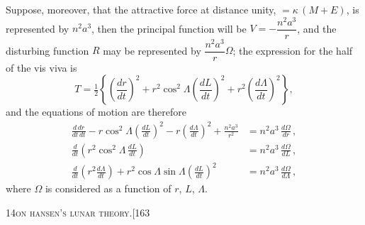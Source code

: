 \documentclass[11pt]{article}
\begin{document}
Suppose, moreover, that the attractive force at distance unity, $= \kappa\,(M+E)$, is represented
by $n^{2}a^{3}$, then the principal function will be $V = -\dfrac{n^{2}a^{3}}{r}$, and the disturbing function $R$
may be represented by $\dfrac{n^{2}a^{3}}{r}\Omega$; the expression for the half of the vis viva is
\[
T = \tfrac{1}{2}\left\{\left(\frac{dr}{dt}\right)^{2} + r^{2}\cos^{2}\Lambda\left(\frac{dL}{dt}\right)^{2} + r^{2}\left(\frac{d\Lambda}{dt}\right)^{2}\right\},
\]
and the equations of motion are therefore
\begin{align*}
\frac{d\,dr}{dt\,dt} - r\cos^{2}\Lambda\left(\frac{dL}{dt}\right)^{2} - r\left(\frac{d\Lambda}{dt}\right)^{2} + \frac{n^{2}a^{3}}{r^{2}} &= n^{2}a^{3}\,\frac{d\Omega}{dr}\,,\\
\frac{d}{dt}\!\left(r^{2}\cos^{2}\Lambda\,\frac{dL}{dt}\right) &= n^{2}a^{3}\,\frac{d\Omega}{dL}\,,\\
\frac{d}{dt}\!\left(r^{2}\frac{d\Lambda}{dt}\right) + r^{2}\cos\Lambda\sin\Lambda\left(\frac{dL}{dt}\right)^{2} &= n^{2}a^{3}\,\frac{d\Omega}{d\Lambda}\,,
\end{align*}
where $\Omega$ is considered as a function of $r$, $L$, $\Lambda$.

\newpage

\begin{center}
\small\textsc{14}\hfill\textsc{on hansen's lunar theory.}\hfill[163
\end{center}

\medskip
\end{document}
